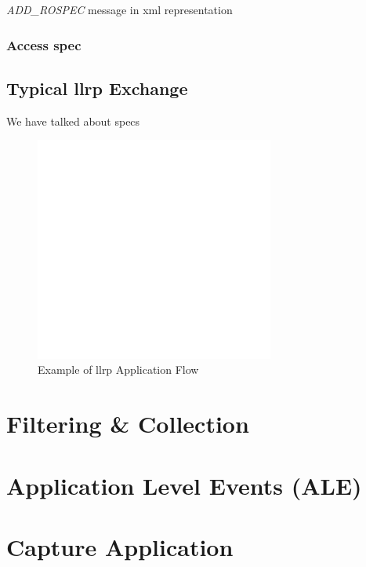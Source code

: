 \begin{listing}
    \inputminted[linenos]{xml}{./code/sota/llrp_messages/ROSPEC.xml}
    \caption{\textit{ADD\_ROSPEC} message in \ac{xml} representation}
    \label{code:rospec}
\end{listing}


\subsubsection{Access \ac{spec}}

\subsection{Typical \ac{llrp} Exchange}

We have talked about \acp{spec}

\begin{figure}[!ht]
    \centering
    \includegraphics[width=0.7\textwidth]{./figs/02-state-of-the-art/llrpflow.pdf}
    \caption{Example of \ac{llrp} Application Flow~\cite{ImpinjLTKProgrammers}} 
    \label{fig:llrpflow}
\end{figure}



\section{Filtering \& Collection}

\section{Application Level Events (ALE)}

\section{Capture Application}

